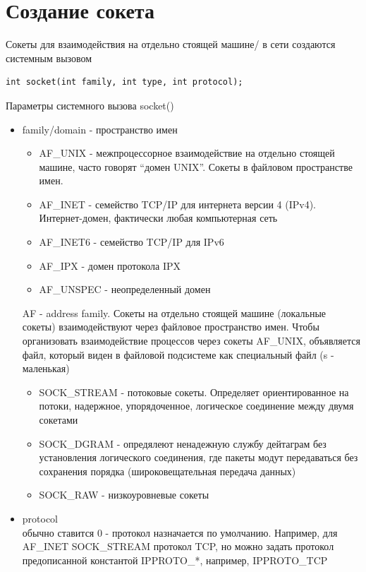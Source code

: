 \section{Создание сокета}

Сокеты для взаимодействия на отдельно стоящей машине/ в сети создаются системным вызовом

\begin{lstlisting}
int socket(int family, int type, int protocol);
\end{lstlisting}

Параметры системного вызова socket()

\begin{itemize}
\item family/domain - пространство имен
\begin{itemize}
\item AF\_UNIX - межпроцессорное взаимодействие на отдельно стоящей машине, часто говорят “домен UNIX”. Сокеты в файловом пространстве имен. 
\item AF\_INET - семейство TCP/IP для интернета версии 4 (IPv4). Интернет-домен, фактически любая компьютерная сеть
\item AF\_INET6 - семейство TCP/IP для IPv6
\item AF\_IPX - домен протокола IPX
\item AF\_UNSPEC - неопределенный домен
\end{itemize} 
AF - address family. Сокеты на отдельно стоящей машине (локальные сокеты) взаимодействуют через файловое пространство имен. Чтобы организовать взаимодействие процессов через сокеты AF\_UNIX, объявляется файл, который виден в файловой подсистеме как специальный файл (s - маленькая)
\begin{itemize}
\item SOCK\_STREAM - потоковые сокеты. Определяет ориентированное на потоки, надержное, упорядоченное, логическое соединение между двумя сокетами
\item SOCK\_DGRAM - опредялеют ненадежную службу дейтаграм без установления логического соединения, где пакеты модут передаваться без сохранения порядка (широковещательная передача данных)
\item SOCK\_RAW - низкоуровневые сокеты
\end{itemize}
\item protocol \\ 
обычно ставится 0 - протокол назначается по умолчанию. Например, для AF\_INET SOCK\_STREAM протокол TCP, но можно задать протокол предописанной константой IPPROTO\_*, например, IPPROTO\_TCP
\end{itemize}

